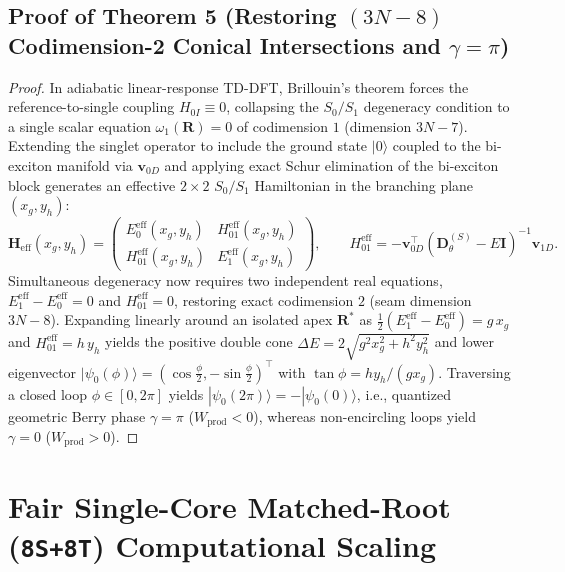 \documentclass[10pt,a4paper]{article}
\begin{document}
\subsection*{Proof of Theorem 5 (Restoring $(3N-8)$ Codimension-2 Conical Intersections and $\gamma=\pi$)}
\begin{proof}
In adiabatic linear-response TD-DFT, Brillouin's theorem forces the reference-to-single coupling $H_{0I} \equiv 0$, collapsing the $S_0/S_1$ degeneracy condition to a single scalar equation $\omega_1(\mathbf{R}) = 0$ of codimension $1$ (dimension $3N-7$). Extending the singlet operator to include the ground state $|0\rangle$ coupled to the bi-exciton manifold via $\mathbf{v}_{0D}$ and applying exact Schur elimination of the bi-exciton block generates an effective $2\times 2$ $S_0/S_1$ Hamiltonian in the branching plane $(x_g, y_h)$:
\begin{equation}
\mathbf{H}_{\mathrm{eff}}(x_g,y_h) = \begin{pmatrix}
E_0^{\mathrm{eff}}(x_g,y_h) & H_{01}^{\mathrm{eff}}(x_g,y_h) \\
H_{01}^{\mathrm{eff}}(x_g,y_h) & E_1^{\mathrm{eff}}(x_g,y_h)
\end{pmatrix}, \qquad
H_{01}^{\mathrm{eff}} = -\mathbf{v}_{0D}^\top (\mathbf{D}_\theta^{(S)} - E\mathbf{I})^{-1} \mathbf{v}_{1D}.
\end{equation}
Simultaneous degeneracy now requires two independent real equations, $E_1^{\mathrm{eff}} - E_0^{\mathrm{eff}} = 0$ and $H_{01}^{\mathrm{eff}} = 0$, restoring exact codimension $2$ (seam dimension $3N-8$). Expanding linearly around an isolated apex $\mathbf{R}^*$ as $\frac{1}{2}(E_1^{\mathrm{eff}}-E_0^{\mathrm{eff}}) = g\,x_g$ and $H_{01}^{\mathrm{eff}} = h\,y_h$ yields the positive double cone $\Delta E = 2\sqrt{g^2 x_g^2 + h^2 y_h^2}$ and lower eigenvector $|\psi_0(\phi)\rangle = (\cos\frac{\phi}{2}, -\sin\frac{\phi}{2})^\top$ with $\tan\phi = h y_h / (g x_g)$. Traversing a closed loop $\phi\in[0,2\pi]$ yields $|\psi_0(2\pi)\rangle = -|\psi_0(0)\rangle$, i.e., quantized geometric Berry phase $\gamma = \pi$ ($W_{\mathrm{prod}} < 0$), whereas non-encircling loops yield $\gamma = 0$ ($W_{\mathrm{prod}} > 0$).
\end{proof}

\section{Fair Single-Core Matched-Root (\texorpdfstring{\texttt{8S+8T}}{8S+8T}) Computational Scaling}
\end{document}
